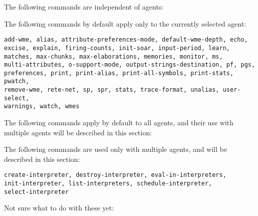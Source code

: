 {The following commands are independent of agents:

 \vspace{12pt}


The following commands by default apply only to the currently selected agent:

\begin{verbatim}
add-wme, alias, attribute-preferences-mode, default-wme-depth, echo, 
excise, explain, firing-counts, init-soar, input-period, learn, 
matches, max-chunks, max-elaborations, memories, monitor, ms, 
multi-attributes, o-support-mode, output-strings-destination, pf, pgs, 
preferences, print, print-alias, print-all-symbols, print-stats, pwatch, 
remove-wme, rete-net, sp, spr, stats, trace-format, unalias, user-select,
warnings, watch, wmes
\end{verbatim} \vspace{12pt}


The following commands apply by default to all agents, and their use with
multiple agents will be described in this section:

  \vspace{12pt}



The following commands are used only with multiple agents, and will be
described in this section:

\begin{verbatim}
create-interpreter, destroy-interpreter, eval-in-interpreters,
init-interpreter, list-interpreters, schedule-interpreter,
select-interpreter
\end{verbatim} \vspace{12pt}


Not sure what to do with these yet:

  \vspace{12pt}




\subsection{ \soar{[-self]}}
\label{run3}

}
